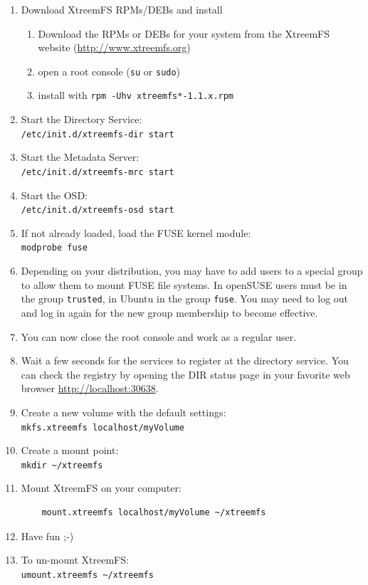 \documentclass[a4paper,10pt]{book}
\begin{document}
\begin{enumerate}
 \item Download XtreemFS RPMs/DEBs and install
	\begin{enumerate}
		\item Download the RPMs or DEBs for your system from the XtreemFS website (\href{http://www.xtreemfs.org}{http://www.xtreemfs.org})
		\item open a root console (\texttt{su} or \texttt{sudo})
		\item install with \texttt{rpm -Uhv xtreemfs*-1.1.x.rpm}
	\end{enumerate}
\item Start the Directory Service:\\
	\texttt{/etc/init.d/xtreemfs-dir start}
\item Start the Metadata Server:\\
	\texttt{/etc/init.d/xtreemfs-mrc start}
\item Start the OSD:\\
	\texttt{/etc/init.d/xtreemfs-osd start}

\item If not already loaded, load the FUSE kernel module:\\
	\texttt{modprobe fuse}

\item Depending on your distribution, you may have to add users to a special group to allow them to mount FUSE file systems. In openSUSE users must be in the group \texttt{trusted}, in Ubuntu in the group \texttt{fuse}. You may need to log out and log in again for the new group membership to become effective.

\item You can now close the root console and work as a regular user.

\item Wait a few seconds for the services to register at the directory service. You can check the registry by opening the DIR status page in your favorite web browser \href{http://localhost:30638}{http://localhost:30638}.

\item Create a new volume with the default settings:\\
	\texttt{mkfs.xtreemfs localhost/myVolume}

\item Create a mount point:\\
	\texttt{mkdir \~{}/xtreemfs}

\item Mount XtreemFS on your computer:
	\begin{verbatim}
	mount.xtreemfs localhost/myVolume ~/xtreemfs
	\end{verbatim}


\item Have fun ;-)

\item To un-mount XtreemFS:\\
	\texttt{umount.xtreemfs \~{}/xtreemfs}
\end{enumerate}
\end{document}
